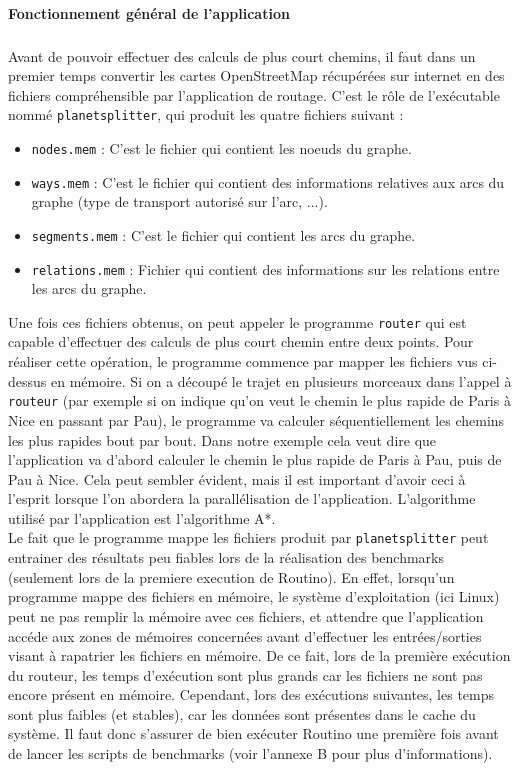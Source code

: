 \paragraph{Fonctionnement général de l'application}
\subparagraph{}

Avant de pouvoir effectuer des calculs de plus court chemins, il faut dans un 
premier temps convertir les cartes OpenStreetMap récupérées sur internet en des 
fichiers compréhensible par l'application de routage. C'est le rôle de 
l'exécutable nommé \texttt{planetsplitter}, qui produit les quatre fichiers 
suivant :

\begin{itemize}
\item \texttt{nodes.mem} : C'est le fichier qui contient les noeuds du graphe.
\item \texttt{ways.mem} : C'est le fichier qui contient des informations 
relatives aux arcs du graphe (type de transport autorisé sur l'arc, ...).
\item \texttt{segments.mem} : C'est le fichier qui contient les arcs du graphe.
\item \texttt{relations.mem} : Fichier qui contient des informations sur les 
relations entre les arcs du graphe. \\
\end{itemize}

Une fois ces fichiers obtenus, on peut appeler le programme \texttt{router} qui 
est capable d'effectuer des calculs de plus court chemin entre deux points. 
Pour réaliser cette opération, le programme commence par mapper les fichiers 
vus ci-dessus en mémoire. Si on a découpé le trajet en plusieurs morceaux dans
l'appel à \texttt{routeur} (par exemple si on indique qu'on veut le chemin le 
plus rapide de Paris à Nice en passant par Pau), le programme va calculer 
séquentiellement les chemins les plus rapides bout par bout. Dans notre exemple 
cela veut dire que l'application va d'abord calculer le chemin le plus rapide de 
Paris à Pau, puis de Pau à Nice. Cela peut sembler évident, mais il est 
important d'avoir ceci à l'esprit lorsque l'on abordera la parallélisation de 
l'application. L'algorithme utilisé par l'application est l'algorithme A*. \\

Le fait que le programme mappe les fichiers produit par \texttt{planetsplitter} 
peut entrainer des résultats peu fiables lors de la réalisation des benchmarks
 (seulement lors de la premiere execution de Routino). En effet, lorsqu'un 
programme mappe des fichiers en mémoire, le système d'exploitation (ici Linux) 
peut ne pas remplir la mémoire avec ces fichiers, et attendre que l'application 
accéde aux zones de mémoires concernées avant d'effectuer les entrées/sorties 
visant à rapatrier les fichiers en mémoire. De ce fait, lors de la première 
exécution du routeur, les temps d'exécution sont plus grands car les fichiers 
ne sont pas encore présent en mémoire. Cependant, lors des exécutions suivantes,
les temps sont plus faibles (et stables), car les données sont présentes dans le
 cache du système. Il faut donc s'assurer de bien exécuter Routino une première 
fois avant de lancer les scripts de benchmarks (voir l'annexe B pour plus 
d'informations). 
 

